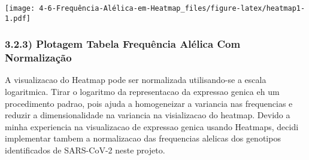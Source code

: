 \documentclass[
]{article}
\begin{document}
\texttt{[image: 4-6-Frequência-Alélica-em-Heatmap\_files/figure-latex/heatmap1-1.pdf]}

\hypertarget{plotagem-tabela-frequuxeancia-aluxe9lica-com-normalizauxe7uxe3o}{%
\subsubsection{3.2.3) Plotagem Tabela Frequência Alélica Com
Normalização}\label{plotagem-tabela-frequuxeancia-aluxe9lica-com-normalizauxe7uxe3o}}

A visualizacao do Heatmap pode ser normalizada utilisando-se a escala
logaritmica. Tirar o logaritmo da representacao da expressao genica eh
um procedimento padrao, pois ajuda a homogeneizar a variancia nas
frequencias e reduzir a dimensionalidade na variancia na visializacao do
heatmap. Devido a minha experiencia na visualizacao de expressao genica
usando Heatmaps, decidi implementar tambem a normalizacao das
frequencias alelicas dos genotipos identificados de SARS-CoV-2 neste
projeto.
\end{document}
